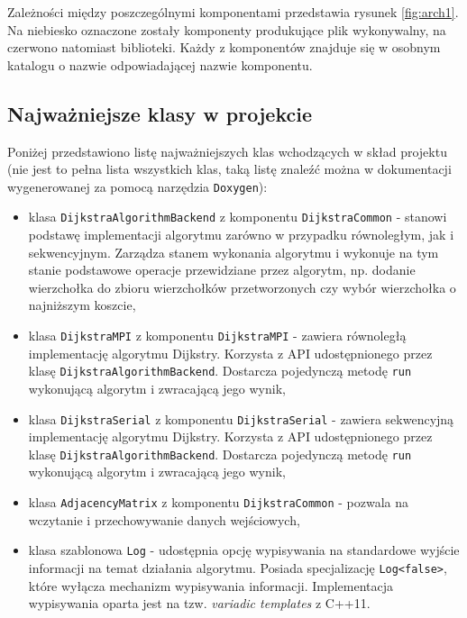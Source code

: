 \documentclass[12pt]{article}
\begin{document}
Zależności między poszczególnymi komponentami przedstawia rysunek \ref{fig:arch1}. Na niebiesko oznaczone zostały komponenty produkujące plik wykonywalny, na czerwono natomiast biblioteki. Każdy z komponentów znajduje się w osobnym katalogu o nazwie odpowiadającej nazwie komponentu.


\subsection{Najważniejsze klasy w projekcie}
Poniżej przedstawiono listę najważniejszych klas wchodzących w skład projektu (nie jest to pełna lista wszystkich klas, taką listę znaleźć można w dokumentacji wygenerowanej za pomocą narzędzia \lstinline{Doxygen}):
\begin{itemize}
\item klasa \lstinline{DijkstraAlgorithmBackend} z komponentu \lstinline{DijkstraCommon} - stanowi podstawę implementacji algorytmu zarówno w przypadku równoległym, jak i sekwencyjnym. Zarządza stanem wykonania algorytmu i wykonuje na tym stanie podstawowe operacje przewidziane przez algorytm, np. dodanie wierzchołka do zbioru wierzchołków przetworzonych czy wybór wierzchołka o najniższym koszcie,
\item klasa \lstinline{DijkstraMPI} z komponentu \lstinline{DijkstraMPI} - zawiera równoległą implementację algorytmu Dijkstry. Korzysta z API udostępnionego przez klasę \lstinline{DijkstraAlgorithmBackend}. Dostarcza pojedynczą metodę \lstinline{run} wykonującą algorytm i zwracającą jego wynik,
\item klasa \lstinline{DijkstraSerial} z komponentu \lstinline{DijkstraSerial} - zawiera sekwencyjną implementację algorytmu Dijkstry. Korzysta z API udostępnionego przez klasę \lstinline{DijkstraAlgorithmBackend}. Dostarcza pojedynczą metodę \lstinline{run} wykonującą algorytm i zwracającą jego wynik,
\item klasa \lstinline{AdjacencyMatrix} z komponentu \lstinline{DijkstraCommon} - pozwala na wczytanie i przechowywanie danych wejściowych,
\item klasa szablonowa \lstinline{Log} - udostępnia opcję wypisywania na standardowe wyjście informacji na temat działania algorytmu. Posiada specjalizację \lstinline{Log<false>}, które wyłącza mechanizm wypisywania informacji. Implementacja wypisywania oparta jest na tzw. \textit{variadic templates} z C++11. 
\end{itemize}

\newpage
\end{document}

